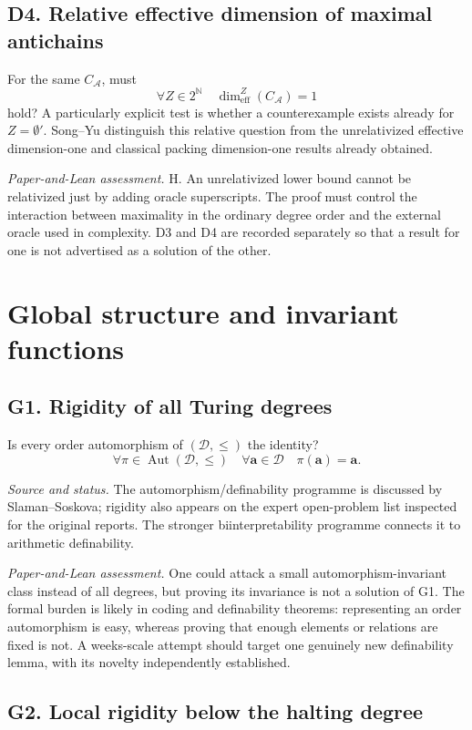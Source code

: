 \documentclass[11pt,a4paper]{article}
\newcommand{\N}{\mathbb N}
\newcommand{\D}{\mathcal D}
\newcommand{\Cantor}{2^{\N}}
\newcommand{\adeg}{\mathbf a}\newcommand{\bdeg}{\mathbf b}
\newcommand{\status}[1]{\par\noindent\textit{Source and status.} #1\par}
\newcommand{\assessment}[1]{\par\noindent\textit{Paper-and-Lean assessment.} #1\par}
\newcommand{\problem}[2]{\subsection{#1. #2}\label{entry:#1}}
\theoremstyle{definition}\newtheorem{definition}[theorem]{Definition}
\theoremstyle{remark}\newtheorem{remark}[theorem]{Remark}
\begin{document}
\problem{D4}{Relative effective dimension of maximal antichains}
For the same $C_{\mathcal A}$, must
\[
             \forall Z\in\Cantor\quad \dim_{\mathrm{eff}}^Z(C_{\mathcal A})=1
\]
hold? A particularly explicit test is whether a counterexample exists already for $Z=\emptyset'$. Song--Yu distinguish this relative question from the unrelativized effective dimension-one and classical packing dimension-one results already obtained.\cite{SY}

\assessment{H. An unrelativized lower bound cannot be relativized just by adding oracle superscripts. The proof must control the interaction between maximality in the ordinary degree order and the external oracle used in complexity. D3 and D4 are recorded separately so that a result for one is not advertised as a solution of the other.}


\section{Global structure and invariant functions}
\label{sec:global}

\subsection{G1. Rigidity of all Turing degrees \Lmark}
\label{entry:G1}

Is every order automorphism of $(\D,\leq)$ the identity?
\[
 \forall\pi\in\operatorname{Aut}(\D,\leq)\quad
 \forall\adeg\in\D\quad\pi(\adeg)=\adeg.
\]
\status{The automorphism/definability programme is discussed by Slaman--Soskova; rigidity also appears on the expert open-problem list inspected for the original reports. The stronger biinterpretability programme connects it to arithmetic definability.\cite{SS,OLP}}

\assessment{One could attack a small automorphism-invariant class instead of all degrees, but proving its invariance is not a solution of G1. The formal burden is likely in coding and definability theorems: representing an order automorphism is easy, whereas proving that enough elements or relations are fixed is not. A weeks-scale attempt should target one genuinely new definability lemma, with its novelty independently established.}

\subsection{G2. Local rigidity below the halting degree \Lmark}
\label{entry:G2}
\end{document}

